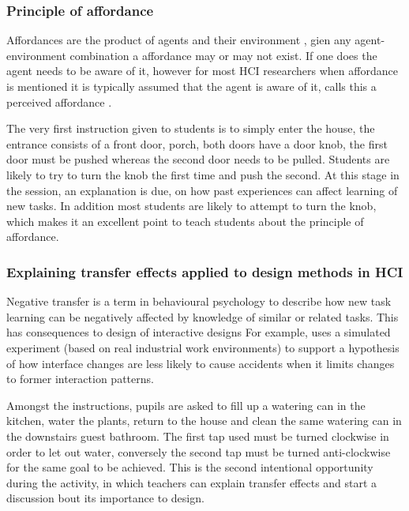 \documentclass{sig-alternate}
\begin{document}
\subsubsection*{Principle of affordance}

Affordances are the product of agents and their environment
\cite{gibson1977theory}, gien any agent-environment combination a
affordance may or may not exist. If one does the agent needs to be
aware of it, however for most HCI researchers when affordance is
mentioned it is typically assumed that the agent is aware of it, calls
this a perceived affordance \cite{norman1999affordance}.

The very first instruction given to students is to simply enter the
house, the entrance consists of a front door, porch, both doors have a
door knob, the first door must be pushed whereas the second door needs
to be pulled. Students are likely to try to turn the knob the first
time and push the second. At this stage in the session, an explanation
is due, on how past experiences can affect learning of new tasks. In
addition most students are likely to attempt to turn the knob, which
makes it an excellent point to teach students about the principle of
affordance.


\subsubsection*{Explaining transfer effects applied to design methods
  in HCI}

Negative transfer\cite{Lunchin, Pan2010, Woltz} is a term in
behavioural psychology to describe how new task learning can be
negatively affected by knowledge of similar or related tasks.  This
has consequences to design of interactive designs
\cite{waern1993varieties} For example,\cite{Besnard2005105} uses a
simulated experiment (based on real industrial work environments) to
support a hypothesis of how interface changes are less likely to cause
accidents when it limits changes to former interaction patterns.

Amongst the instructions, pupils are asked to fill up a watering can
in the kitchen, water the plants, return to the house and clean the
same watering can in the downstairs guest bathroom. The first tap used
must be turned clockwise in order to let out water, conversely the
second tap must be turned anti-clockwise for the same goal to be
achieved. This is the second intentional opportunity during the
activity, in which teachers can explain transfer effects and start a
discussion bout its importance to design.
\end{document}
